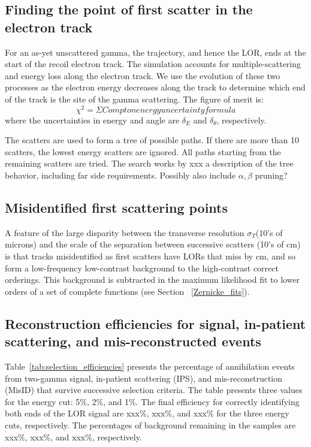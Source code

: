 \documentclass[12pt]{article}
\def\sigT{$\sigma_T$}
\begin{document}
\subsection{Finding the point of first scatter in the electron track}
\label{point_of_first_scatter}

For an as-yet unscattered gamma, the trajectory, and hence the LOR, ends at the start of the recoil electron track. The simulation accounts for multiple-scattering and energy loss along the electron track. We use the evolution of these two processes as the electron energy decreases along the track to determine which end of the track is the site of the gamma scattering. The figure of merit is:
\begin{equation}
\chi^2 = \Sigma Compton energy uncertainty formula %
\end{equation}
where the uncertainties in energy and angle are $\delta_E$ and $\delta_\theta$, respectively.

The scatters are used to form a tree of possible paths. If there are more than 10 scatters, the lowest energy scatters are ignored. All paths starting from the remaining scatters are tried. The search works by xxx a description of the tree behavior, including far side requirements. Possibly also include $\alpha,\beta$ pruning?

\subsection{Misidentified first scattering points}
A feature of the large disparity between the transverse resolution \sigT (10's of microns) and the scale of the separation between successive scatters (10's of cm) is that tracks misidentified as first scatters have LORs that miss by cm, and so form a low-frequency low-contrast background to the high-contrast correct orderings. This background is subtracted in the maximum likelihood fit to lower orders of a set of complete functions (see Section ~\ref{Zernicke_fits}).

\subsection{Reconstruction efficiencies for signal, in-patient scattering, and mis-reconstructed events}

Table~\ref{tab:selection_efficiencies}
 presents the percentage of annihilation events from two-gamma signal, in-patient scattering (IPS), and mis-reconstruction (MisID) that survive successive selection criteria. The table presents three values for the energy cut: 5\%, 2\%, and 1\%. The final efficiency for correctly identifying both ends of the LOR signal  are xxx\%, xxx\%, and  xxx\% for the three energy cuts, respectively. The percentages of background remaining in the samples are xxx\%, xxx\%, and  xxx\%, respectively.
\end{document}
